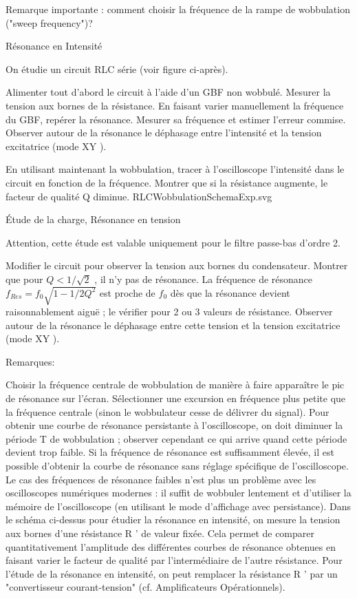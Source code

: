 \documentclass{article}%
\begin{document}
Remarque importante : comment choisir la fréquence de la rampe de wobbulation ("sweep frequency")?


Résonance en Intensité

On étudie un circuit RLC série (voir figure ci-après).

Alimenter tout d'abord le circuit à l'aide d'un GBF non wobbulé. Mesurer la tension aux bornes de la résistance. En faisant varier manuellement la fréquence du GBF, repérer la résonance. Mesurer sa fréquence et estimer l'erreur commise. Observer autour de la résonance le déphasage entre l'intensité et la tension excitatrice (mode XY ).

En utilisant maintenant la wobbulation, tracer à l'oscilloscope l'intensité dans le circuit en fonction de la fréquence. Montrer que si la résistance augmente, le facteur de qualité Q diminue.
RLCWobbulationSchemaExp.svg

Étude de la charge, Résonance en tension

Attention, cette étude est valable uniquement pour le filtre passe-bas d'ordre 2.

Modifier le circuit pour observer la tension aux bornes du condensateur. Montrer que pour $Q<1/\sqrt{2}$ , il n'y pas de résonance. La fréquence de résonance $f_{Res}=f_0 \sqrt{1-1/2Q^2}$ est proche de $f_0$ dès que la résonance devient raisonnablement aiguë ; le vérifier pour 2 ou 3 valeurs de résistance. Observer autour de la résonance le déphasage entre cette tension et la tension excitatrice (mode XY ).

Remarques:

    Choisir la fréquence centrale de wobbulation de manière à faire apparaître le pic de résonance sur l'écran.
    Sélectionner une excursion en fréquence plus petite que la fréquence centrale (sinon le wobbulateur cesse de délivrer du signal).
    Pour obtenir une courbe de résonance persistante à l'oscilloscope, on doit diminuer la période T de wobbulation ; observer cependant ce qui arrive quand cette période devient trop faible. Si la fréquence de résonance est suffisamment élevée, il est possible d'obtenir la courbe de résonance sans réglage spécifique de l'oscilloscope. Le cas des fréquences de résonance faibles n'est plus un problème avec les oscilloscopes numériques modernes : il suffit de wobbuler lentement et d'utiliser la mémoire de l'oscilloscope (en utilisant le mode d'affichage avec persistance).
    Dans le schéma ci-dessus pour étudier la résonance en intensité, on mesure la tension aux bornes d'une résistance R ' de valeur fixée. Cela permet de comparer quantitativement l'amplitude des différentes courbes de résonance obtenues en faisant varier le facteur de qualité par l'intermédiaire de l'autre résistance.
    Pour l'étude de la résonance en intensité, on peut remplacer la résistance R ' par un "convertisseur courant-tension" (cf. Amplificateurs Opérationnels).
\end{document}
